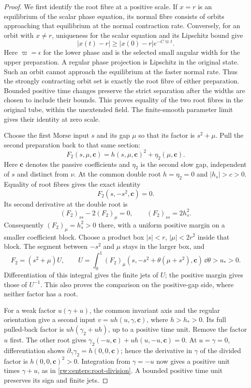 \begin{proof}
We first identify the root fibre at a positive scale. If $x=r$ is an
equilibrium of the scalar phase equation, its normal fibre consists of
orbits approaching that equilibrium at the normal contraction rate.
Conversely, for an orbit with $x\ne r$, uniqueness for the scalar
equation and its Lipschitz bound give
\[
 |x(t)-r|\ge |x(0)-r|e^{-C\varpi t}.
\]
Here $\varpi=\epsilon$ for the lower phase and is the selected small
angular width for the upper preparation. A regular phase projection is
Lipschitz in the original state. Such an orbit cannot approach the
equilibrium at the faster normal rate. Thus the strongly contracting
orbit set is exactly the root fibre of either preparation. Bounded
positive time changes preserve the strict separation after the widths
are chosen to include their bounds. This proves equality of the two
root fibres in the original tube, within the unextended field. The
finite-smooth parameter limit gives their identity at zero scale.

Choose the first Morse input $s$ and its gap $\mu$ so that its factor
is $s^2+\mu$. Pull the second preparation back to that same section:
\[
 F_2(s,\mu,\mathbf c)=h(s,\mu,\mathbf c)^2+\eta_2(\mu,\mathbf c).
\]
Here $\mathbf c$ denotes the passive coefficients and $\eta_2$ is
the second slow gap, independent of $s$ and distinct from $\nu$.
At the common double root $h=\eta_2=0$ and $|h_s|>c>0$.
Equality of root fibres gives the exact identity
\begin{equation}\label{rw:centers:root-identity}
 F_2(s,-s^2,\mathbf c)=0.
\end{equation}
Its second derivative at the double root is
\[
 (F_2)_{ss}-2(F_2)_\mu=0,\qquad
 (F_2)_{ss}=2h_s^2.
\]
Consequently $(F_2)_\mu=h_s^2>0$ there, with a uniform positive
margin on a smaller coefficient block. Choose a product box
$|s|<r$, $|\mu|<2r^2$ inside that block. The segment between
$-s^2$ and $\mu$ stays in the larger box, and
\begin{equation}\label{rw:centers:root-division}
 F_2=(s^2+\mu)U,\qquad
 U=\int_0^1(F_2)_\mu
       (s,-s^2+\theta(\mu+s^2),\mathbf c)\,\dd\theta>u_*>0.
\end{equation}
Differentiation of this integral gives the finite jets of $U$;
the positive margin gives those of $U^{-1}$. This also proves the
comparison on the positive-gap side, where neither factor has a root.

For a weak factor $u(\gamma+u)$, the common invariant axis and the
regular orientation give a second input $v=u h(u,\gamma,\mathbf c)$,
where $h>h_*>0$. Its full pulled-back factor is
$u h(\gamma_2+u h)$, up to a positive time unit. Remove the factor
$u$ first. The other root gives
$\gamma_2(-u,\mathbf c)+u h(u,-u,\mathbf c)=0$.
At $u=\gamma=0$, differentiation shows
$\partial_\gamma\gamma_2=h(0,0,\mathbf c)$; hence the derivative
in $\gamma$ of the divided factor is $h(0,0,\mathbf c)^2>0$.
Integration from $\gamma=-u$ now gives a positive unit times
$\gamma+u$, as in \eqref{rw:centers:root-division}. A bounded positive
time unit preserves its sign and finite jets.


\end{proof}
